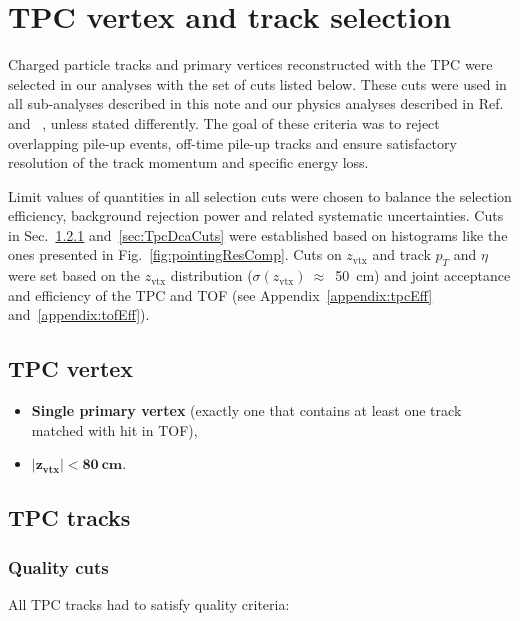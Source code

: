 

\chapter{TPC vertex and track selection}\label{chap:TpcTrackQualityCuts}

Charged particle tracks and primary vertices reconstructed with the TPC were selected in our analyses with the set of cuts listed below. These cuts were used in all sub-analyses described in this note and our physics analyses described in Ref.~\cite{AnalysisNoteRafal} and ~\cite{AnalysisNoteLukasz}, unless stated differently. The goal of these criteria was to reject overlapping pile-up events, off-time pile-up tracks and ensure satisfactory resolution of the track momentum and specific energy loss.

Limit values of quantities in all selection cuts were chosen to balance the selection efficiency, background rejection power and related systematic uncertainties. Cuts in Sec.~\ref{sec:TpcQualityCuts} and~\ref{sec:TpcDcaCuts} were established based on histograms like the ones presented in Fig.~\ref{fig:pointingResComp}. Cuts on $z_{\text{vtx}}$ and track $p_{T}$ and $\eta$ were set based on the $z_{\text{vtx}}$ distribution ($\sigma(z_{\text{vtx}})~\approx$~50~cm) and joint acceptance and efficiency of the TPC and TOF (see Appendix~\ref{appendix:tpcEff} and~\ref{appendix:tofEff}).

\section{TPC vertex}
\begin{itemize}
\item \textbf{Single primary vertex} (exactly one that contains at least one track matched with hit in TOF),
\item \textbf{$\bm{|z_{\text{vtx}}|<80~\text{cm}}$}.
\end{itemize}

\section{TPC tracks}
\subsection{Quality cuts}\label{sec:TpcQualityCuts}
All TPC tracks had to satisfy quality criteria:

